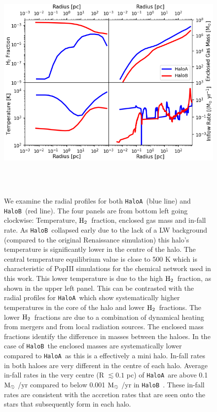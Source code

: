 \documentclass[graphics, twocolumn, usenatbib]{mn2e}
\newcommand{\msolar} {$\rm{M_{\odot}}~$}
\newcommand{\molH} {$\rm{H_2}$~}
\newcommand{\ha} {\texttt{HaloA~}}
\newcommand{\hb} {\texttt{HaloB~}}
\begin{document}
\begin{figure}
\centering
\begin{minipage}{175mm}      \begin{center}
\centerline{
    \includegraphics[width=18.0cm, height=12cm]{FIGURES/MultiPlot.png}}
\caption{We examine the radial profiles for both \ha (blue line) and \hb (red line). The four panels
  are from bottom left going clockwise: Temperature, \molH fraction, enclosed gas mass and in-fall rate.
  As \hb collapsed early due to the lack of a LW background (compared to the original Renaissance simulation)
  this halo's temperature is significantly lower in the centre of the halo. The central temperature equilibrium
  value is close to 500 K which is characteristic of PopIII simulations for the chemical network used in this work.
  This lower temperature is due to the high \molH fraction, as shown in the upper left panel. This can
  be contrasted with the radial profiles for \ha which show systematically higher temperatures in the core of the
  halo and lower \molH fractions. The lower \molH fractions are due to a combination of dynamical heating from
  mergers and from local radiation sources. The enclosed mass fractions identify the difference
  in masses between the haloes. In the case of \hb the enclosed masses are systematically lower compared
  to \ha as this is a effectively a mini halo. In-fall rates in both haloes are very different in the
  centre of each halo. Average in-fall rates in the very centre (R $\lesssim 0.1$ pc) of \ha are
  above 0.1 \msolar/yr compared to below 0.001 \msolar/yr in \hb. These in-fall rates are consistent
  with the accretion rates that are seen onto the stars that subsequently form in each halo. }
\label{Fig:RadialProfiles}
\end{center} \end{minipage}
\end{figure}
\end{document}
